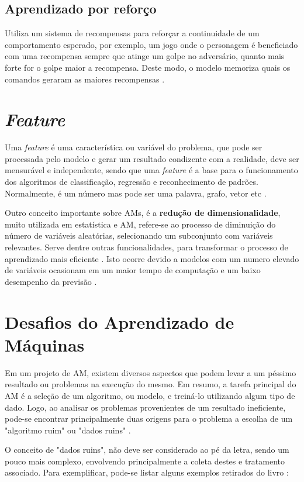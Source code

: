 \subsection{Aprendizado por reforço}
Utiliza um sistema de recompensas para reforçar a continuidade de um comportamento esperado, por exemplo, um jogo onde o personagem é beneficiado com uma recompensa sempre que atinge um golpe no adversário, quanto mais forte for o golpe maior a recompensa. Deste modo, o modelo memoriza quais os comandos geraram as maiores recompensas \cite{kirk2014thoughtful}.

\section{\textit{Feature}} 
Uma \textit{feature} é uma característica ou variável do problema, que pode ser processada pelo modelo e gerar um resultado condizente com a realidade, deve ser mensurável e independente, sendo que uma \textit{feature} é a base para o funcionamento dos algoritmos de classificação, regressão e reconhecimento de padrões. Normalmente, é um número mas pode ser uma palavra, grafo, vetor etc \cite{chandrashekar2014survey}.

Outro conceito importante sobre AMs, é a \textbf{redução de dimensionalidade}, muito utilizada em estatística e AM, refere-se ao processo de diminuição do número de variáveis aleatórias, selecionando um subconjunto com variáveis relevantes. Serve dentre outras funcionalidades, para transformar o processo de aprendizado mais eficiente \cite{borges2006reduccao}. Isto ocorre devido a modelos com um numero elevado de variáveis ocasionam em um maior tempo de computação e um baixo desempenho da previsão \cite{chandrashekar2014survey}.

\section{Desafios do Aprendizado de Máquinas}
Em um projeto de AM, existem diversos aspectos que podem levar a um péssimo resultado ou problemas na execução do mesmo. Em resumo, a tarefa principal do AM é a seleção de um algoritmo, ou modelo, e treiná-lo utilizando algum tipo de dado. Logo, ao analisar os problemas provenientes de um resultado ineficiente, pode-se encontrar principalmente duas origens para o problema a escolha de um "algoritmo ruim" ou "dados ruins" \cite{geron2017hands}.

O conceito de "dados ruins", não deve ser considerado ao pé da letra, sendo um pouco mais complexo, envolvendo principalmente a coleta destes e tratamento associado. Para exemplificar,  pode-se listar alguns exemplos retirados do livro \cite{geron2017hands}:

